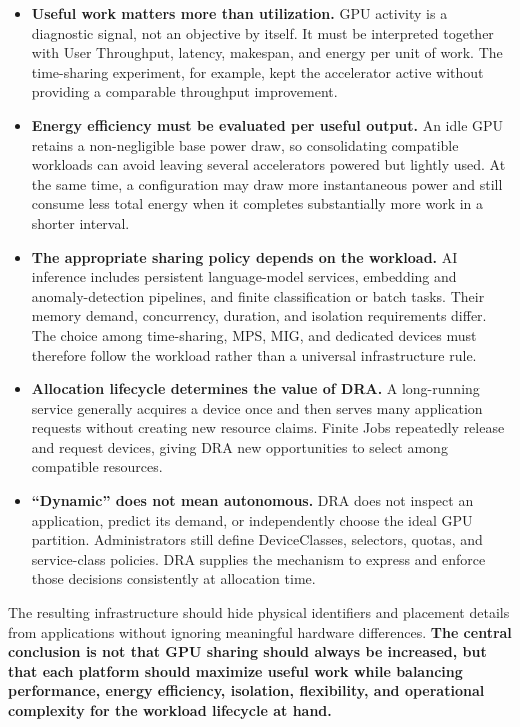 \begin{itemize}
    \item \textbf{Useful work matters more than utilization.} GPU activity is a diagnostic signal, not an objective by itself. It must be interpreted together with User Throughput, latency, makespan, and energy per unit of work. The time-sharing experiment, for example, kept the accelerator active without providing a comparable throughput improvement.

    \item \textbf{Energy efficiency must be evaluated per useful output.} An idle GPU retains a non-negligible base power draw, so consolidating compatible workloads can avoid leaving several accelerators powered but lightly used. At the same time, a configuration may draw more instantaneous power and still consume less total energy when it completes substantially more work in a shorter interval.

    \item \textbf{The appropriate sharing policy depends on the workload.} AI inference includes persistent language-model services, embedding and anomaly-detection pipelines, and finite classification or batch tasks. Their memory demand, concurrency, duration, and isolation requirements differ. The choice among time-sharing, MPS, MIG, and dedicated devices must therefore follow the workload rather than a universal infrastructure rule.

    \item \textbf{Allocation lifecycle determines the value of DRA.} A long-running service generally acquires a device once and then serves many application requests without creating new resource claims. Finite Jobs repeatedly release and request devices, giving DRA new opportunities to select among compatible resources.

    \item \textbf{``Dynamic'' does not mean autonomous.} DRA does not inspect an application, predict its demand, or independently choose the ideal GPU partition. Administrators still define DeviceClasses, selectors, quotas, and service-class policies. DRA supplies the mechanism to express and enforce those decisions consistently at allocation time.
\end{itemize}

The resulting infrastructure should hide physical identifiers and placement details from applications without ignoring meaningful hardware differences. \textbf{The central conclusion is not that GPU sharing should always be increased, but that each platform should maximize useful work while balancing performance, energy efficiency, isolation, flexibility, and operational complexity for the workload lifecycle at hand.}

